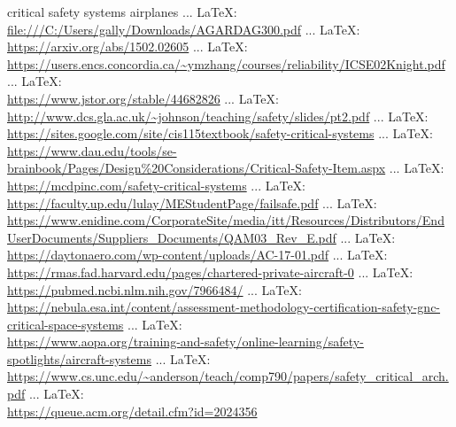 \begin{thebibliography}{99}
{{{{{{%
critical safety systems airplanes
 ... \LaTeX:\\ \url{file:///C:/Users/gally/Downloads/AGARDAG300.pdf}
 ... \LaTeX:\\ \url{https://arxiv.org/abs/1502.02605}
 ... \LaTeX:\\ \url{https://users.encs.concordia.ca/~ymzhang/courses/reliability/ICSE02Knight.pdf}
 ... \LaTeX:\\ \url{https://www.jstor.org/stable/44682826}
 ... \LaTeX:\\ \url{http://www.dcs.gla.ac.uk/~johnson/teaching/safety/slides/pt2.pdf}
 ... \LaTeX:\\ \url{https://sites.google.com/site/cis115textbook/safety-critical-systems}
 ... \LaTeX:\\ \url{https://www.dau.edu/tools/se-brainbook/Pages/Design%20Considerations/Critical-Safety-Item.aspx}
 ... \LaTeX:\\ \url{https://mcdpinc.com/safety-critical-systems}
 ... \LaTeX:\\ \url{https://faculty.up.edu/lulay/MEStudentPage/failsafe.pdf}
 ... \LaTeX:\\ \url{https://www.enidine.com/CorporateSite/media/itt/Resources/Distributors/EndUserDocuments/Suppliers_Documents/QAM03_Rev_E.pdf}
 ... \LaTeX:\\ \url{https://daytonaero.com/wp-content/uploads/AC-17-01.pdf}
 ... \LaTeX:\\ \url{https://rmas.fad.harvard.edu/pages/chartered-private-aircraft-0}
 ... \LaTeX:\\ \url{https://pubmed.ncbi.nlm.nih.gov/7966484/}
 ... \LaTeX:\\ \url{https://nebula.esa.int/content/assessment-methodology-certification-safety-gnc-critical-space-systems}
 ... \LaTeX:\\ \url{https://www.aopa.org/training-and-safety/online-learning/safety-spotlights/aircraft-systems}
 ... \LaTeX:\\ \url{https://www.cs.unc.edu/~anderson/teach/comp790/papers/safety_critical_arch.pdf}
 ... \LaTeX:\\ \url{https://queue.acm.org/detail.cfm?id=2024356}
}}}}}}
\end{thebibliography}
